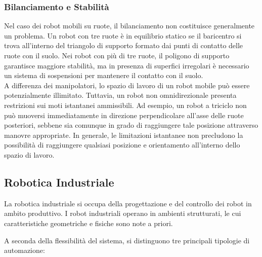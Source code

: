 \documentclass[11pt, a4paper]{report}
\begin{document}

\subsubsection{Bilanciamento e Stabilità}
Nel caso dei robot mobili su ruote, il bilanciamento non costituisce generalmente un problema. Un robot con tre ruote è in equilibrio statico se il baricentro si trova all'interno del triangolo di supporto formato dai punti di contatto delle ruote con il suolo. Nei robot con più di tre ruote, il poligono di supporto garantisce maggiore stabilità, ma in presenza di superfici irregolari è necessario un sistema di sospensioni per mantenere il contatto con il suolo.\\
A differenza dei manipolatori, lo spazio di lavoro di un robot mobile può essere potenzialmente illimitato. Tuttavia, un robot non omnidirezionale presenta restrizioni sui moti istantanei ammissibili. Ad esempio, un robot a triciclo non può muoversi immediatamente in direzione perpendicolare all'asse delle ruote posteriori, sebbene sia comunque in grado di raggiungere tale posizione attraverso manovre appropriate. In generale, le limitazioni istantanee non precludono la possibilità di raggiungere qualsiasi posizione e orientamento all'interno dello spazio di lavoro.

\newpage
\subsection{Robotica Industriale}

La robotica industriale si occupa della progettazione e del controllo dei robot in ambito produttivo. I robot industriali operano in ambienti strutturati, le cui caratteristiche geometriche e fisiche sono note a priori.

A seconda della flessibilità del sistema, si distinguono tre principali tipologie di automazione:
\end{document}
